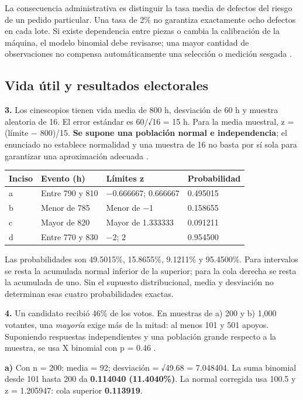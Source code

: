 {La consecuencia administrativa es distinguir la tasa media de defectos del riesgo de un pedido particular. Una tasa de 2\% no garantiza exactamente ocho defectos en cada lote. Si existe dependencia entre piezas o cambia la calibración de la máquina, el modelo binomial debe revisarse; una mayor cantidad de observaciones no compensa automáticamente una selección o medición sesgada \citep{bradley2021}.

\clearpage
\subsection{Vida útil y resultados electorales}
\textbf{3.} Los cinescopios tienen vida media de 800 h, desviación de 60 h y muestra aleatoria de 16. El error estándar es 60/√16 = 15 h. Para la media muestral, z = (límite − 800)/15. \textbf{Se supone una población normal e independencia}; el enunciado no establece normalidad y una muestra de 16 no basta por sí sola para garantizar una aproximación adecuada \citep{holmesBusiness2023}.

\begin{center}
\begin{tabular}{llll}
\textbf{Inciso} & \textbf{Evento (h)} & \textbf{Límites z} & \textbf{Probabilidad}\\\hline
a & Entre 790 y 810 & −0.666667; 0.666667 & 0.495015\\
b & Menor de 785 & Menor de −1 & 0.158655\\
c & Mayor de 820 & Mayor de 1.333333 & 0.091211\\
d & Entre 770 y 830 & −2; 2 & 0.954500\\
\end{tabular}
\end{center}

Las probabilidades son 49.5015\%, 15.8655\%, 9.1211\% y 95.4500\%. Para intervalos se resta la acumulada normal inferior de la superior; para la cola derecha se resta la acumulada de uno. Sin el supuesto distribucional, media y desviación no determinan esas cuatro probabilidades exactas.

\textbf{4.} Un candidato recibió 46\% de los votos. En muestras de a) 200 y b) 1,000 votantes, una \textit{mayoría} exige más de la mitad: al menos 101 y 501 apoyos. Suponiendo respuestas independientes y una población grande respecto a la muestra, se usa X binomial con p = 0.46 \citep{holmesBusiness2023}.

\textbf{a)} Con n = 200: media = 92; desviación = √49.68 = 7.048404. La suma binomial desde 101 hasta 200 da \textbf{0.114040 (11.4040\%)}. La normal corregida usa 100.5 y z = 1.205947: cola superior \textbf{0.113919}.

}
